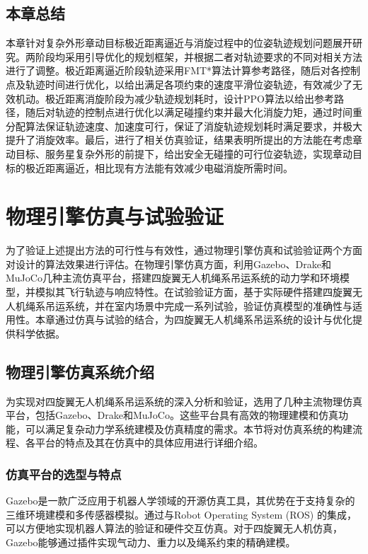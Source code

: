 \documentclass[lang=chs, degree=master, blindreview=false, winfonts=true]{yanputhesis}
\begin{document}
\section{本章总结}
本章针对复杂外形章动目标极近距离逼近与消旋过程中的位姿轨迹规划问题展开研究。两阶段均采用引导优化的规划框架，并根据二者对轨迹要求的不同对相关方法进行了调整。极近距离逼近阶段轨迹采用FMT*算法计算参考路径，随后对各控制点及轨迹时间进行优化，以给出满足各项约束的速度平滑位姿轨迹，有效减少了无效机动。极近距离消旋阶段为减少轨迹规划耗时，设计PPO算法以给出参考路径，随后对轨迹的控制点进行优化以满足碰撞约束并最大化消旋力矩，通过时间重分配算法保证轨迹速度、加速度可行，保证了消旋轨迹规划耗时满足要求，并极大提升了消旋效率。最后，进行了相关仿真验证，结果表明所提出的方法能在考虑章动目标、服务星复杂外形的前提下，给出安全无碰撞的可行位姿轨迹，实现章动目标的极近距离逼近，相比现有方法能有效减少电磁消旋所需时间。


\cleardoublepage

\chapter{物理引擎仿真与试验验证}
为了验证上述提出方法的可行性与有效性，通过物理引擎仿真和试验验证两个方面对设计的算法效果进行评估。在物理引擎仿真方面，利用Gazebo、Drake和MuJoCo几种主流仿真平台，搭建四旋翼无人机绳系吊运系统的动力学和环境模型，并模拟其飞行轨迹与响应特性。在试验验证方面，基于实际硬件搭建四旋翼无人机绳系吊运系统，并在室内场景中完成一系列试验，验证仿真模型的准确性与适用性。本章通过仿真与试验的结合，为四旋翼无人机绳系吊运系统的设计与优化提供科学依据。
\section{物理引擎仿真系统介绍}

为实现对四旋翼无人机绳系吊运系统的深入分析和验证，选用了几种主流物理仿真平台，包括Gazebo、Drake和MuJoCo。这些平台具有高效的物理建模和仿真功能，可以满足复杂动力学系统建模及仿真精度的需求。本节将对仿真系统的构建流程、各平台的特点及其在仿真中的具体应用进行详细介绍。

\subsection{仿真平台的选型与特点}
Gazebo是一款广泛应用于机器人学领域的开源仿真工具，其优势在于支持复杂的三维环境建模和多传感器模拟。通过与Robot Operating System (ROS) 的集成，可以方便地实现机器人算法的验证和硬件交互仿真。对于四旋翼无人机仿真，Gazebo能够通过插件实现气动力、重力以及绳系约束的精确建模。
\end{document}

